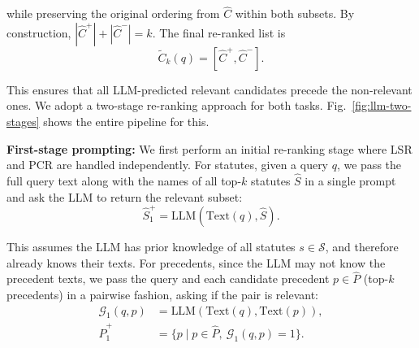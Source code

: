 \vspace{-2mm}
\noindent while preserving the original ordering from $\hat C$ within both subsets. By construction,  $|\hat C^+| + |\hat C^-| = k$.
The final re-ranked list is
\vspace{-2mm}
\[\tilde C_k(q) = [\hat C^+, \hat C^-].\]

\vspace{-2mm}
\noindent This ensures that all LLM-predicted relevant candidates precede the non-relevant ones.  We adopt a two-stage re-ranking approach for both tasks. Fig.~\ref{fig:llm-two-stages} shows the entire pipeline for this.

\vspace{1mm}
\noindent\textbf{First-stage prompting:} 
We first perform an initial re-ranking stage where LSR and PCR are handled independently. For statutes, given a query $q$, we pass the full query text along with the names of all top-$k$ statutes $\hat S$ in a single prompt and ask the LLM to return the relevant subset: \vspace{-2mm} 
\[
\hat S_1^+ = \textrm{LLM}(\textrm{Text}(q), \hat S).
\]

\vspace{-2mm}
\noindent This assumes the LLM has prior knowledge of all statutes $s \in \mathcal S$, and therefore already knows their texts. 
For precedents, since the LLM may not know the precedent texts, we pass the query and each candidate precedent $p \in \hat P$ (top-$k$ precedents) in a pairwise fashion, asking if the pair is relevant:
\vspace{-2mm}
\begin{align*}
\mathcal G_1(q,p) &= \textrm{LLM}(\textrm{Text}(q), \textrm{Text}(p)), \\
\hat P_1^+ &= \{p \mid p \in \hat P, \ \mathcal G_1(q,p)=1\}.
\end{align*}

